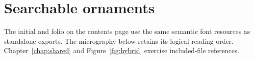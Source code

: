 \chapter[Searchable ornaments]{Searchable ornaments}\label{chap:text}
The initial and folio on the contents page use the same semantic font resources as
standalone exports. The micrography below retains its logical reading order.
Chapter~\ref{chap:shared} and Figure~\ref{fig:hybrid} exercise included-file references.
\noindent{}
